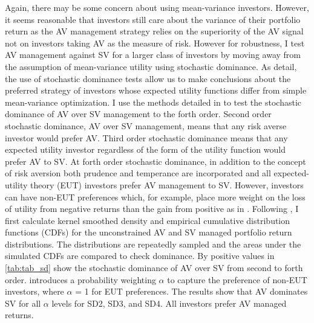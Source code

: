 Again, there may be some concern about using mean-variance investors. However, it seems reasonable that investors still care about the variance of their portfolio return as the AV management strategy relies on the superiority of the AV signal not on investors taking AV as the measure of risk. However for robustness, I test AV management against SV for a larger class of investors by moving away from the assumption of mean-variance utility using stochastic dominance. As \citet{hadar_rules_1969,hanoch_efficiency_1969,rothschild_increasing_1970,levy_experimental_2002} detail, the use of stochastic dominance tests allow us to make conclusions about the preferred strategy of investors whose expected utility functions differ from simple mean-variance optimization. I use the methods detailed in \citet{vinod_h.d._ranking_2004,vinod_hands-intermediate_2008} to test the stochastic dominance of AV over SV management to the forth order. Second order stochastic dominance, AV over SV management, means that any risk averse investor would prefer AV. \citep{mcfadden_testing_1989,valle_novel_2017} Third order stochastic dominance means that any expected utility investor regardless of the form of the utility function would prefer AV to SV. \citep{whitmore_third-degree_1970,chan_third_2016} At forth order stochastic dominance, in addition to the concept of risk aversion both prudence and temperance are incorporated and all expected-utility theory (EUT) investors prefer AV management to SV. \citep{kimball_standard_1993,noauthor_risk-aversion_nodate} However, investors can have non-EUT preferences which, for example, place more weight on the loss of utility from negative returns than the gain from positive as in \citet{kahneman_prospect_1979}. Following \citet{vinod_hands-intermediate_2008}, I first calculate kernel smoothed density and empirical cumulative distribution functions (CDFs) for the unconstrained AV and SV managed portfolio return distributions. The distributions are repeatedly sampled and the areas under the simulated CDFs are compared to check dominance. By \citet{vinod_h.d._ranking_2004,vinod_hands-intermediate_2008} positive values in \ref{tab:tab_sd} show the stochastic dominance of AV over SV from second to forth order. \citet{prelec_probability_1998} introduces a probability weighting $\alpha$ to capture the preference of non-EUT investors, where $\alpha$ = 1 for EUT preferences. The results show that AV dominates SV for all $\alpha$ levels for SD2, SD3, and SD4. All investors prefer AV managed returns.  

